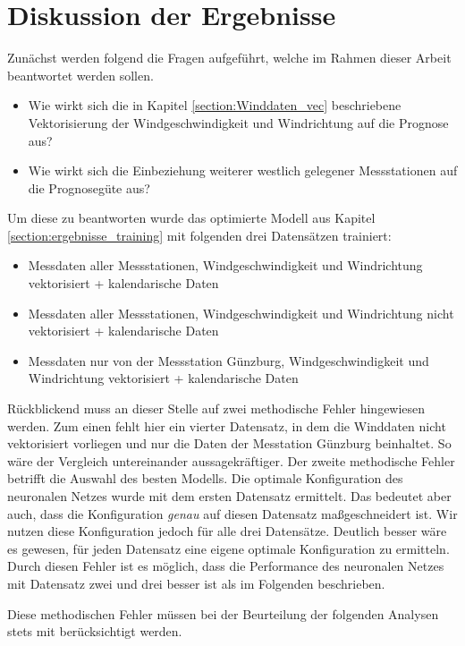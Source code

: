 \documentclass[
12pt, %
toc=listofnumbered, %
toc=chapterentrydotfill, %
numbers=noenddot, %
captions=tableheading, %
bibliography=numbered
]{scrreprt}
\let\Oldsection\section
\renewcommand{\section}{\FloatBarrier\Oldsection}
\newcommand{\qm}[1]{\glqq#1\grqq{}} %
\begin{document}
\section{Diskussion der Ergebnisse}\label{section:diskussion_ergebnisse}
Zunächst werden folgend die Fragen aufgeführt, welche im Rahmen dieser Arbeit beantwortet werden sollen.


\begin{itemize}
	\item Wie wirkt sich die in Kapitel \ref{section:Winddaten_vec} beschriebene Vektorisierung der Windgeschwindigkeit und Windrichtung auf die Prognose aus?
	\item Wie wirkt sich die Einbeziehung weiterer westlich gelegener Messstationen auf die Prognosegüte aus?
\end{itemize}

Um diese zu beantworten wurde das optimierte Modell aus Kapitel \ref{section:ergebnisse_training} mit folgenden drei Datensätzen trainiert:

\begin{itemize}
	\item Messdaten aller Messstationen, Windgeschwindigkeit und Windrichtung vektorisiert + kalendarische Daten
	\item Messdaten aller Messstationen, Windgeschwindigkeit und Windrichtung nicht vektorisiert + kalendarische Daten
	\item Messdaten nur von der Messstation Günzburg, Windgeschwindigkeit und Windrichtung vektorisiert + kalendarische Daten
\end{itemize}

Rückblickend muss an dieser Stelle auf zwei methodische Fehler hingewiesen werden. Zum einen fehlt hier ein vierter Datensatz, in dem die Winddaten nicht vektorisiert vorliegen und nur die Daten der Messtation Günzburg beinhaltet. So wäre der Vergleich untereinander aussagekräftiger. Der zweite methodische Fehler betrifft die Auswahl des besten Modells. Die optimale Konfiguration des neuronalen Netzes wurde mit dem ersten Datensatz ermittelt. Das bedeutet aber auch, dass die Konfiguration \textit{genau} auf diesen Datensatz \qm{maßgeschneidert} ist. Wir nutzen diese Konfiguration jedoch für alle drei Datensätze. Deutlich besser wäre es gewesen, für jeden Datensatz eine eigene optimale Konfiguration zu ermitteln. Durch diesen Fehler ist es möglich, dass die Performance des neuronalen Netzes mit Datensatz zwei und drei besser ist als im Folgenden beschrieben.

Diese methodischen Fehler müssen bei der Beurteilung der folgenden Analysen stets mit berücksichtigt werden.
\end{document}
